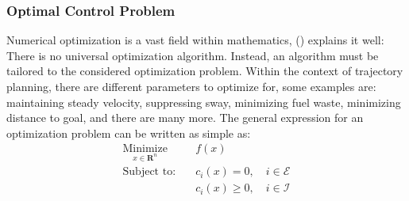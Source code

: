\subsubsection*{Optimal Control Problem} \label{CHAP: OCP}
Numerical optimization is a vast field within mathematics, (\cite{wright1999numerical}) explains it well: 
There is no universal optimization algorithm. Instead, an algorithm must be tailored to the considered optimization problem. 
Within the context of trajectory planning, there are different parameters to optimize for, some examples are: 
maintaining steady velocity, suppressing sway, minimizing fuel waste, minimizing distance to goal, and 
there are many more. The general expression for an optimization problem can be written as simple as:
\begin{subequations}
    \begin{align}
    \underset{x\in \textbf{R}^n}{\textrm{Minimize}} \quad & f(x) \\
        \textrm{Subject to:} \quad & c_i(x) = 0, \quad i \in \mathcal{E} \\
                             \quad & c_i(x) \geq 0, \quad i \in \mathcal{I} 
    \end{align}
\end{subequations}
